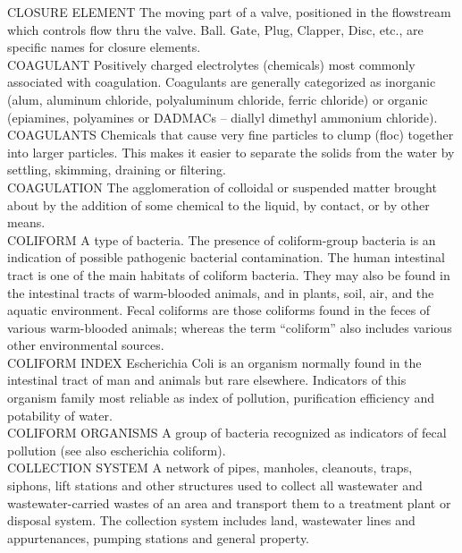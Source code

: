 \documentclass{article}
\begin{document}
CLOSURE ELEMENT
The moving part of a valve, positioned in the flowstream which controls flow thru the valve. Ball. Gate, Plug, Clapper, Disc, etc., are specific names for closure elements.
\vspace{0.3cm}\\
COAGULANT
Positively charged electrolytes (chemicals) most commonly associated with coagulation. Coagulants are generally categorized as inorganic (alum, aluminum chloride, polyaluminum chloride, ferric chloride) or organic (epiamines, polyamines or DADMACs – diallyl dimethyl ammonium chloride).
\vspace{0.3cm}\\
COAGULANTS
Chemicals that cause very fine particles to clump (floc) together into larger particles. This makes it easier to separate the solids from the water by settling, skimming, draining or filtering.
\vspace{0.3cm}\\
COAGULATION
The agglomeration of colloidal or suspended matter brought about by the addition of some chemical to the liquid, by contact, or by other means.
\vspace{0.3cm}\\
COLIFORM
A type of bacteria. The presence of coliform-group bacteria is an indication of possible pathogenic bacterial contamination. The human intestinal tract is one of the main habitats of coliform bacteria. They may also be found in the intestinal tracts of warm-blooded animals, and in plants, soil, air, and the aquatic environment. Fecal coliforms are those coliforms found in the feces of various warm-blooded animals; whereas the term “coliform” also includes various other environmental sources.
\vspace{0.3cm}\\
COLIFORM INDEX
Escherichia Coli is an organism normally found in the intestinal tract of man and animals but rare elsewhere.  Indicators of this organism family most reliable as index of pollution, purification efficiency and potability of water.
\vspace{0.3cm}\\
COLIFORM ORGANISMS
A group of bacteria recognized as indicators of fecal pollution (see also escherichia coliform).
\vspace{0.3cm}\\
COLLECTION SYSTEM
A network of pipes, manholes, cleanouts, traps, siphons, lift stations and other structures used to collect all wastewater and wastewater-carried wastes of an area and transport them to a treatment plant or disposal system. The collection system includes land, wastewater lines and appurtenances, pumping stations and general property. 
\end{document}
